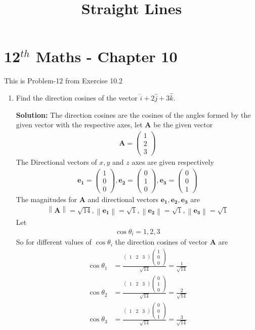 \documentclass[12pt]{article}
\providecommand{\norm}[1]{\left\lVert#1\right\rVert}
\newcommand{\solution}{\noindent \textbf{Solution: }}
\newcommand{\myvec}[1]{\ensuremath{\begin{pmatrix}#1\end{pmatrix}}}
\let\vec\mathbf
\begin{document}
\begin{center}
\enlargethispage{-4cm}
\title{\textbf{Straight Lines}}
\date{\vspace{-5ex}} %
\maketitle
\end{center}
\setcounter{page}{1}
\section*{12$^{th}$ Maths - Chapter 10}
This is Problem-12 from Exercise 10.2
\begin{enumerate}
\item Find the direction cosines of the vector $\hat{i} +2\hat{j}+3\hat{k}$.

\solution The direction cosines are the cosines of the angles formed by the given vector with the respective axes, let $\vec{A}$ be the given vector
\begin{align}
	\vec{A} =\myvec{1\\2\\3}
\end{align}
The Directional vectors of $x,y$ and $z$ axes are given respectively 
\begin{align}
		\vec{e_1} =\myvec{1\\0\\0},\vec{e_2}=\myvec{0\\1\\0},\vec{e_3} =\myvec{0\\0\\1}
\end{align}
		The magnitudes for $\vec{A}$ and directional vectors $\vec{e_1},\vec{e_2},\vec{e_3}$ are
	\begin{align}
\norm{\vec{A}} =\sqrt{14},\norm{\vec{e_1}}=\sqrt{1},\norm{\vec{e_2}}=\sqrt{1},\norm{\vec{e_3}}=\sqrt{1}
	\end{align}
Let 
\begin{align}
	\cos\theta_i=1,2,3  
\end{align}
		So for different values of $\cos\theta_i$ the direction cosines of vector $\vec{A}$ are
\begin{align}
	\cos\theta_1 &=\frac{\myvec{1&2&3}\myvec{1\\0\\0}}{\sqrt{14}}=\frac{1}{\sqrt{14}}\\
	\cos\theta_2 &=\frac{\myvec{1&2&3}\myvec{0\\1\\0}}{\sqrt{14}}=\frac{2}{\sqrt{14}}\\
	\cos\theta_3 &=\frac{\myvec{1&2&3}\myvec{0\\0\\1}}{\sqrt{14}}=\frac{3}{\sqrt{14}}
\end{align}
\end{enumerate}
\end{document}
